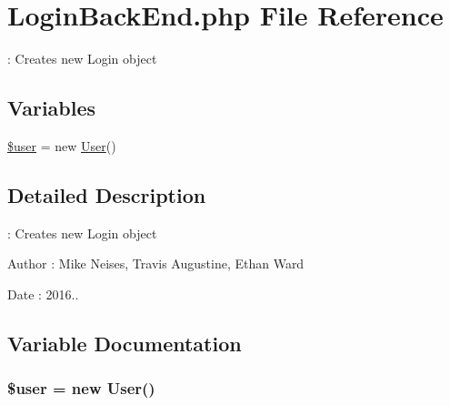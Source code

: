 \hypertarget{_login_back_end_8php}{}\section{Login\+Back\+End.\+php File Reference}
\label{_login_back_end_8php}


\+: Creates new Login object  


\subsection*{Variables}
\begin{DoxyCompactItemize}
\item 
\hyperlink{_login_back_end_8php_a598ca4e71b15a1313ec95f0df1027ca5}{\$user} = new \hyperlink{class_user}{User}()
\end{DoxyCompactItemize}


\subsection{Detailed Description}
\+: Creates new Login object 

\begin{DoxyAuthor}{Author}
\+: Mike Neises, Travis Augustine, Ethan Ward 
\end{DoxyAuthor}
\begin{DoxyDate}{Date}
\+: 2016.. 
\end{DoxyDate}


\subsection{Variable Documentation}
\subsubsection[{\texorpdfstring{\$user}{$user}}]{\setlength{\rightskip}{0pt plus 5cm}\$user = new {\bf User}()}\hypertarget{_login_back_end_8php_a598ca4e71b15a1313ec95f0df1027ca5}{}\label{_login_back_end_8php_a598ca4e71b15a1313ec95f0df1027ca5}
